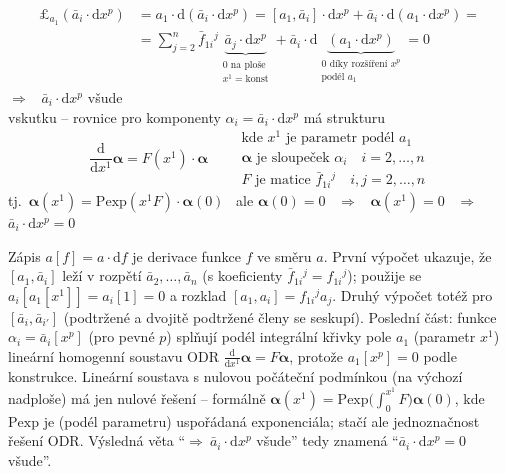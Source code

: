 \begin{align*}
  \pounds_{a_1}(\bar a_i\cdot\mathrm{d}x^{p}) &= a_1\cdot\mathrm{d}(\bar a_i\cdot\mathrm{d}x^{p}) = [a_1,\bar a_i]\cdot\mathrm{d}x^{p} + \bar a_i\cdot\mathrm{d}(a_1\cdot\mathrm{d}x^{p}) = \\
  &= \sum_{j=2}^{n}\bar f_{1i}{}^{j}\underbrace{\bar a_j\cdot\mathrm{d}x^{p}}_{\substack{0 \text{ na ploše}\\ x^{1} = \text{konst}}}
   + \bar a_i\cdot\mathrm{d}\underbrace{(a_1\cdot\mathrm{d}x^{p})}_{\substack{0 \text{ díky rozšíření } x^{p}\\ \text{podél } a_1}} = 0
\end{align*}
$\Rightarrow$ \ $\bar a_i\cdot\mathrm{d}x^{p}$ všude \\
vskutku -- rovnice pro komponenty $\alpha_i = \bar a_i\cdot\mathrm{d}x^{p}$ má strukturu
\[
  \frac{\mathrm{d}}{\mathrm{d}x^{1}}\boldsymbol{\alpha} = F(x^{1})\cdot\boldsymbol{\alpha}
  \qquad
  \begin{array}{l}
    \text{kde } x^{1} \text{ je parametr podél } a_1 \\
    \boldsymbol{\alpha} \text{ je sloupeček } \alpha_i \quad i = 2,\dots,n \\
    F \text{ je matice } \bar f_{1i}{}^{j} \quad i,j = 2,\dots,n
  \end{array}
\]
tj.\ $\boldsymbol{\alpha}(x^{1}) = \mathrm{Pexp}(x^{1}F)\cdot\boldsymbol{\alpha}(0)$ \ ale $\boldsymbol{\alpha}(0) = 0$ \ $\Rightarrow$ \ $\boldsymbol{\alpha}(x^{1}) = 0$ \ $\Rightarrow$ \ $\bar a_i\cdot\mathrm{d}x^{p} = 0$

\begin{vysvetleni}
Zápis $a[f]=a\cdot\mathrm{d}f$ je derivace funkce $f$ ve směru $a$. První výpočet ukazuje, že $[a_1,\bar a_i]$ leží v rozpětí $\bar a_2,\dots,\bar a_n$ (s koeficienty $\bar f_{1i}{}^{j}=f_{1i}{}^{j}$); použije se $a_i[a_1[x^{1}]]=a_i[1]=0$ a rozklad $[a_1,a_i]=f_{1i}{}^{j}a_j$. Druhý výpočet totéž pro $[\bar a_i,\bar a_{i'}]$ (podtržené a dvojitě podtržené členy se seskupí).
Poslední část: funkce $\alpha_i=\bar a_i[x^{p}]$ (pro pevné $p$) splňují podél integrální křivky pole $a_1$ (parametr $x^{1}$) lineární homogenní soustavu ODR $\frac{\mathrm{d}}{\mathrm{d}x^{1}}\boldsymbol\alpha=F\boldsymbol\alpha$, protože $a_1[x^{p}]=0$ podle konstrukce. Lineární soustava s nulovou počáteční podmínkou (na výchozí nadploše) má jen nulové řešení -- formálně $\boldsymbol\alpha(x^{1})=\mathrm{Pexp}\big(\int_0^{x^{1}}F\big)\boldsymbol\alpha(0)$, kde $\mathrm{Pexp}$ je (podél parametru) uspořádaná exponenciála; stačí ale jednoznačnost řešení ODR. Výsledná věta ``$\Rightarrow\ \bar a_i\cdot\mathrm{d}x^{p}$ všude'' tedy znamená ``$\bar a_i\cdot\mathrm{d}x^{p}=0$ všude''.
\end{vysvetleni}
